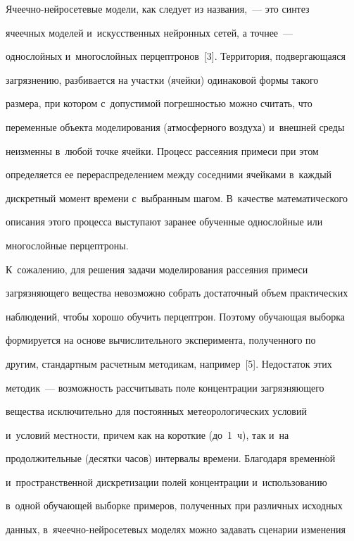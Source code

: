   


  Ячеечно-нейросетевые модели, как следует из названия,~--- это синтез 


ячеечных моделей и~искусственных нейронных сетей, а точнее~--- 


однослойных и~многослойных перцептронов~[3]. Территория, подвергающаяся 


загрязнению, разбивается на участки (ячейки) одинаковой формы такого 


размера, при котором с~допустимой погрешностью можно считать, что 


переменные объекта моделирования (атмосферного воздуха) и~внешней среды 


неизменны в~любой точке ячейки. Процесс рассеяния примеси при этом 


определяется ее перераспределением между соседними ячейками в~каждый 


дискретный момент времени с~выбранным шагом. В~качестве математического 


описания этого процесса выступают заранее обученные однослойные или 


многослойные перцептроны.


  


  К~сожалению, для решения задачи моделирования рассеяния примеси 


загрязняющего вещества невозможно собрать достаточный объем практических 


наблюдений, чтобы хорошо обучить перцептрон. Поэтому обучающая выборка 


формируется на основе вычислительного эксперимента, полученного по 


другим, стандартным расчетным методикам, например~[5]. Недостаток этих 


методик~--- возможность рассчитывать поле концентрации загрязняющего 


вещества исключительно для постоянных метеорологических условий 


и~условий местности, причем как на короткие (до~1~ч), так и~на 


продолжительные (десятки часов) интервалы времени. Благодаря временн$\acute{\mbox{о}}$й 


и~пространственной дискретизации полей концентрации и~использованию 


в~одной обучающей выборке примеров, полученных при различных исходных 


данных, в~яче\-еч\-но-ней\-ро\-се\-те\-вых моделях можно задавать сценарии изменения 


